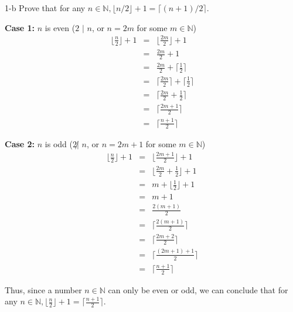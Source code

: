 \documentclass[11pt]{article}
\begin{document}
\begin{prob}{1-b}
Prove that for any $n \in \mathbb{N}, \lfloor n/2\rfloor + 1 = \lceil (n+1)/2 \rceil$.
\end{prob}
\begin{sol}
\textbf{Case 1:} $n$ is even ($2$ $|$ $n$, or $n = 2m$ for some $m \in \mathbb{N}$) 
\begin{eqnarray*}
\Big\lfloor\frac{n}{2} \Big\rfloor + 1 & = & \Big\lfloor\frac{2m}{2} \Big\rfloor + 1\\
& = & \frac{2m}{2} + 1 \\
& = & \frac{2m}{2} + \Big\lceil\frac{1}{2}\Big\rceil \\
& = & \Big\lceil\frac{2m}{2}\Big\rceil + \Big\lceil\frac{1}{2}\Big\rceil \\
& = & \Big\lceil\frac{2m}{2} + \frac{1}{2}\Big\rceil \\
& = & \Big\lceil \frac{2m + 1}{2} \Big\rceil \\
& = & \Big\lceil\frac{n+1}{2} \Big\rceil
\end{eqnarray*}

\textbf{Case 2:} $n$ is odd ($2 \not|$  $n$, or $n = 2m + 1$ for some $m \in \mathbb{N}$) \\
\begin{eqnarray*}
\Big\lfloor\frac{n}{2}\Big\rfloor + 1 & = & \Big\lfloor\frac{2m+1}{2}\Big\rfloor + 1 \\
& = & \Big\lfloor\frac{2m}{2} + \frac{1}{2}\Big\rfloor + 1 \\
& = & m + \Big\lfloor\frac{1}{2}\Big\rfloor + 1 \\
& = & m + 1 \\
& = & \frac{2(m+1)}{2} \\
& = & \Big\lceil\frac{2(m+1)}{2}\Big\rceil \\
& = & \Big\lceil\frac{2m + 2}{2}\Big\rceil \\
& = & \Big\lceil\frac{(2m + 1) + 1}{2}\Big\rceil \\
& = & \Big\lceil\frac{n+1}{2}\Big\rceil
\end{eqnarray*}

Thus, since a number $n \in \mathbb{N}$ can only be even or odd, we can conclude that for any $n \in \mathbb{N}, \Big\lfloor\frac{n}{2}\Big\rfloor + 1 = \Big\lceil\frac{n+1}{2}\Big\rceil$.
\end{sol}
\end{document}
